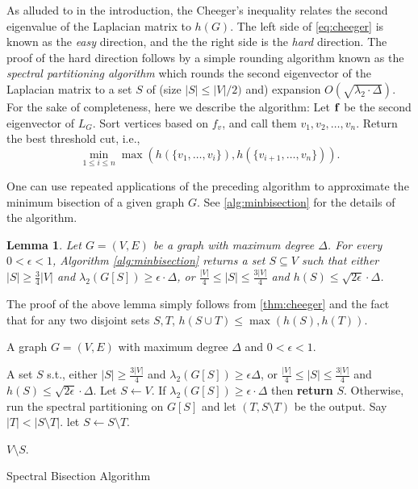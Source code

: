 \documentclass[11pt]{article}
\newcommand{\Input}{\item[{\bf Input:}]}
\newcommand{\Output}{\item[{\bf Output:}]}
\renewcommand{\Return}{\item[{\bf return}]}
\def\bof{{\bf f}}
\def\h{h}
\newtheorem{lemma}{Lemma}[section]
\begin{document}
As alluded to in the introduction, the Cheeger's inequality relates the second eigenvalue of the Laplacian matrix to $\h(G)$. The left side of \eqref{eq:cheeger} is known as the \emph{easy} direction, and the the right side is the \emph{hard} direction. The proof of the hard direction follows by a simple rounding algorithm known as the \emph{spectral partitioning algorithm} which rounds the second eigenvector of the Laplacian matrix to a set $S$ of (size $|S|\leq |V|/2)$ and) expansion $O(\sqrt{\lambda_2\cdot \Delta})$. 
For the sake of completeness, here we describe the algorithm:
Let $\bof$ be the second eigenvector of $L_G$. Sort vertices based on $f_v$, and call them $v_1,v_2,\dots,v_n$. Return the best threshold cut, i.e., 
$$ \min_{1\leq i\leq n} \max(h(\{v_1,\dots,v_i\}), h(\{v_{i+1},\dots,v_n\})).$$


One can use repeated applications of the preceding algorithm to approximate the minimum bisection of a given graph $G$. See \autoref{alg:minbisection} for the details of the algorithm. 
\begin{lemma}
\label{lem:bisection}
 Let $G=(V,E)$ be a graph with maximum degree $\Delta$. For every $0< \epsilon <1$, Algorithm \ref{alg:minbisection} returns a set $S \subseteq{V}$ such that either $|S| \geq \frac{3}{4} |V|$ and $\lambda_2 (G[S]) \geq \epsilon \cdot \Delta$, or $\frac{|V|}{4} \leq |S| \leq \frac{3|V|}{4}$ and $\h(S) \leq \sqrt{2\epsilon}\cdot\Delta$.
\end{lemma}
The proof of the above lemma simply follows from \autoref{thm:cheeger} and the fact that for any two disjoint sets $S,T$, $h(S\cup T)\leq \max(\h(S),h(T))$.
\begin{algorithm}
\begin{algorithmic}[1]
	\Input A graph $G=(V,E)$ with maximum degree $\Delta$ and $0<\epsilon <1$.
	\Output A set $S$ s.t., either  $|S| \geq \frac{3|V|}{4}$ and $\lambda_2(G[S])\geq \epsilon\Delta$, or  $\frac{|V|}{4} \leq |S| \leq \frac{3|V|}{4}$ and $h(S) \leq \sqrt{2\epsilon}\cdot \Delta.$
	\State Let $S\leftarrow V$.
		\State If $\lambda_2(G[S]) \geq \epsilon\cdot \Delta$ then \textbf{return} $S$.
			 \label{line:returnexpander} 
		\State Otherwise, run the spectral partitioning on $G[S]$ and let $(T,S\setminus{T})$ be the output.
		 	\State Say $|T|<|S\setminus T|$. let $S \leftarrow S \setminus{T}$. 
	\EndWhile
	\Return $V\setminus S$.
\end{algorithmic}
\caption{Spectral Bisection Algorithm}
\label{alg:minbisection}
\end{algorithm}
\end{document}
